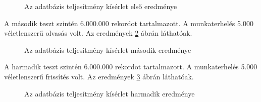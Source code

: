 \documentclass{article}
\begin{document}
	\begin{figure}
		\centering
		\caption{Az adatbázis teljesítmény kísérlet első eredménye \cite{martins2019study}}
		\label{fig:performance_a}
	\end{figure}

	A második teszt szintén 6.000.000 rekordot tartalmazott. A munkaterhelés 5.000 véletlenszerű olvasás volt. Az eredmények \ref{fig:performance_b} ábrán láthatóak.
	
	\begin{figure}
		\centering
		\caption{Az adatbázis teljesítmény kísérlet második eredménye \cite{martins2019study}}
		\label{fig:performance_b}
	\end{figure}
	
	A harmadik teszt szintén 6.000.000 rekordot tartalmazott. A munkaterhelés 5.000 véletlenszerű frissítés volt. Az eredmények \ref{fig:performance_c} ábrán láthatóak.
	
	\begin{figure}
		\centering
		\caption{Az adatbázis teljesítmény kísérlet harmadik eredménye \cite{martins2019study}}
		\label{fig:performance_c}
	\end{figure}
	
\end{document}
